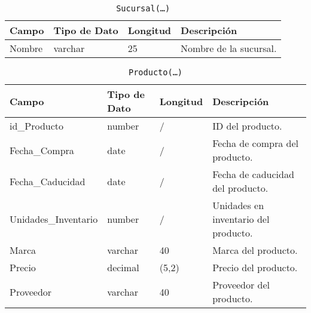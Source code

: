 \documentclass{article}
\begin{document}
\begin{table}[h]
	\centering
	\caption{\texttt{Sucursal(\ldots)}}
	\begin{tabular}{|l|l|l|l|}
		\hline
		Campo  & Tipo de Dato & Longitud & Descripción            \\ \hline
		Nombre & varchar      & 25       & Nombre de la sucursal. \\ \hline
	\end{tabular}
\end{table}

\begin{table}[h]
	\centering
	\caption{\texttt{Producto(\ldots)}}
	\begin{tabular}{|l|l|l|l|}
		\hline
		Campo                & Tipo de Dato & Longitud & Descripción                          \\ \hline
		id\_Producto         & number       & /        & ID del producto.                     \\ \hline
		Fecha\_Compra        & date         & /        & Fecha de compra  del producto.       \\ \hline
		Fecha\_Caducidad     & date         & /        & Fecha de caducidad del producto.     \\ \hline
		Unidades\_Inventario & number       & /        & Unidades en inventario del producto. \\ \hline
        Marca                & varchar      & 40       & Marca del producto.         		  \\ \hline
		Precio               & decimal      & (5,2)    & Precio del producto.                 \\ \hline
		Proveedor            & varchar      & 40       & Proveedor del producto.              \\ \hline
	\end{tabular}
\end{table}
\end{document}
